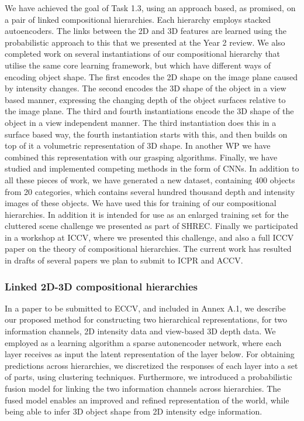 \documentclass[a4paper,11pt,pdf]{../templates/pacmanreport}
\begin{document}
We have achieved the goal of Task 1.3, using an approach based, as promised, on a pair of linked compositional hierarchies. Each hierarchy employs stacked autoencoders. The links between the 2D and 3D features are learned using the probabilistic approach to this that we presented at the Year 2 review. We also completed work on several instantiations of our compositional hierarchy that utilise the same core learning framework, but which have different ways of encoding object shape. The first encodes the 2D shape on the image plane caused by intensity changes. The second encodes the 3D shape of the object in a view based manner, expressing the changing depth of the object surfaces relative to the image plane. The third and fourth instantiations encode the 3D shape of the object in a view independent manner. The third instantiation does this in a surface based way, the fourth instantiation starts with this, and then builds on top of it a volumetric representation of 3D shape. In another WP we have combined this representation with our grasping algorithms. Finally, we have studied and implemented competing methods in the form of CNNs. In addition to all these pieces of work, we have generated a new dataset, containing 400 objects from 20 categories, which contains several hundred thousand depth and intensity images of these objects. We have used this for training of our compositional hierarchies. In addition it is intended for use as an enlarged training set for the cluttered scene challenge we presented as part of SHREC. Finally we participated in a workshop at ICCV, where we presented this challenge, and also a full ICCV paper on the theory of compositional hierarchies. The current work has resulted in drafts of several papers we plan to submit to ICPR and ACCV.

\subsubsection{Linked 2D-3D compositional hierarchies}

In a paper to be submitted to ECCV, and included in Annex A.1, we describe our proposed method for constructing two hierarchical representations, for two information channels, 2D intensity data and view-based 3D depth data. We employed as a learning algorithm a sparse autonencoder network, where each layer receives as input the latent representation of the layer below. For obtaining predictions across hierarchies, we discretized the responses of each layer into a set of parts, using clustering techniques. Furthermore, we introduced a probabilistic fusion model for linking the two information channels across hierarchies. The fused model enables an improved and refined representation of the world, while being able to infer 3D object shape from 2D intensity edge information.
\end{document}

